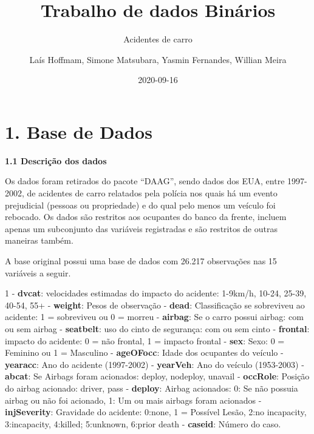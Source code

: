\documentclass[
]{article}
\title{Trabalho de dados Binários}
\subtitle{Acidentes de carro}
\author{Laís Hoffmam, Simone Matsubara, Yasmin Fernandes, Willian Meira}
\date{2020-09-16}
\begin{document}
\maketitle

\hypertarget{base-de-dados}{%
\section{1. Base de Dados}\label{base-de-dados}}

\textbf{1.1 Descrição dos dados}

Os dados foram retirados do pacote ``DAAG'', sendo dados dos EUA, entre
1997-2002, de acidentes de carro relatados pela polícia nos quais há um
evento prejudicial (pessoas ou propriedade) e do qual pelo menos um
veículo foi rebocado. Os dados são restritos aos ocupantes do banco da
frente, incluem apenas um subconjunto das variáveis registradas e são
restritos de outras maneiras também.

A base original possui uma base de dados com 26.217 observações nas 15
variáveis a seguir.

1 - \textbf{dvcat}: velocidades estimadas do impacto do acidente:
1-9km/h, 10-24, 25-39, 40-54, 55+  - \textbf{weight}: Pesos de
observação  - \textbf{dead}: Classificação se sobreviveu ao
acidente: 1 = sobreviveu ou 0 = morreu  - \textbf{airbag}: Se
o carro possui airbag: com ou sem airbag  - \textbf{seatbelt}:
uso do cinto de segurança: com ou sem cinto  -
\textbf{frontal}: impacto do acidente: 0 = não frontal, 1 = impacto
frontal  - \textbf{sex}: Sexo: 0 = Feminino ou 1 = Masculino
 - \textbf{ageOFocc}: Idade dos ocupantes do veículo
 - \textbf{yearacc}: Ano do acidente (1997-2002)  -
\textbf{yearVeh}: Ano do veículo (1953-2003)  -
\textbf{abcat}: Se Airbags foram acionados: deploy, nodeploy, unavail
 - \textbf{occRole}: Posição do airbag acionado: driver, pass
 - \textbf{deploy}: Airbag acionados: 0: Se não possuia
airbag ou não foi acionado, 1: Um ou mais airbags foram acionados
 - \textbf{injSeverity}: Gravidade do acidente: 0:none, 1 =
Possível Lesão, 2:no incapacity, 3:incapacity, 4:killed; 5:unknown,
6:prior death  - \textbf{caseid}: Número do caso.
\end{document}
